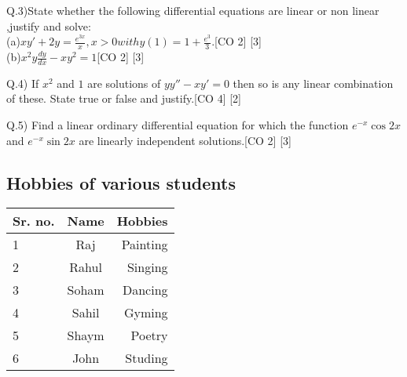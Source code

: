 \documentclass[12pt]{article}
\begin{document}
	\begin{flushleft}
		Q.3)State whether the following differential equations are linear or non linear ,justify and solve:\\[10pt]
		(a)$xy'+2y = \frac{e^{3x}}{x}, x>0 with y(1)=1+\frac{e^3}{3}. $\hspace{3.5cm}[CO 2] [3]\\[6 pt]
		(b)$x^2y\frac{dy}{dx}- xy^2 = 1$\hspace{7.05cm}[CO 2] [3]
	\end{flushleft}
	
	\begin{flushleft}
		Q.4) If $x^2$ and $1$ are solutions of $yy''-xy'=0$ then so is any linear combination of these. State true or false and justify.\hspace{2cm}[CO 4] [2]
	\end{flushleft}
	
	\begin{flushleft}
		Q.5) Find a linear ordinary differential equation for which the function $e^{-x}\cos{2x}$ and $e^{-x}\sin{2x}$ are linearly independent solutions.\hspace{0.7cm}[CO 2] [3]
	\end{flushleft}
	
	\newpage
	
	\begin{table}
		
		\begin{center}
			
			
			
			\section{Hobbies of various students}
			
			
			\label{A ) }
			\begin{tabular}{|l|c|r|}
				
				\textbf{Sr. no.} & 
				\textbf{Name} &
				\textbf{Hobbies}\\
				
				\hline
				1	 & 		Raj		     & 	Painting		\\
				2	 & 		Rahul		 & 	Singing	\\
				3	 & 		Soham    	 & 	Dancing		\\
				4	 & 		Sahil   	 & 	Gyming		\\
				5	 & 		Shaym	     & 	Poetry		\\
				6	 & 		John	     & 	Studing		\\
				
			\end{tabular}
			
		\end{center}
		
	\end{table}
	
\end{document}
